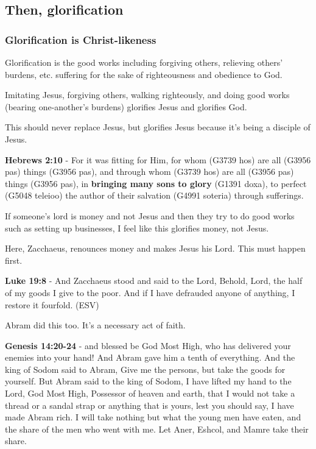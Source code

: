 \documentclass[11pt]{article}
\begin{document}
\subsection{Then, glorification}
\label{sec:orgccc315c}
\subsubsection{Glorification is Christ-likeness}
\label{sec:org62ac995}
Glorification is the good works including forgiving others, relieving others' burdens, etc. suffering for the sake of righteousness and obedience to God.

Imitating Jesus, forgiving others, walking righteously, and doing good works (bearing one-another's burdens) glorifies Jesus and glorifies God.

This should never replace Jesus, but glorifies Jesus because it's being a disciple of Jesus.

\textbf{Hebrews 2:10} - For it was fitting for Him, for whom (G3739 hos) are all (G3956 pas) things (G3956 pas), and through whom (G3739 hos) are all (G3956 pas) things (G3956 pas), in \textbf{bringing many sons to glory} (G1391 doxa), to perfect (G5048 teleioo) the author of their salvation (G4991 soteria) through sufferings.

If someone's lord is money and not Jesus and then they try to do good works such as setting up businesses, I feel like this glorifies money, not Jesus.

Here, Zacchaeus, renounces money and makes Jesus his Lord. This must happen first.

\textbf{Luke 19:8} - And Zacchaeus stood and said to the Lord, Behold, Lord, the half of my goods I give to the poor. And if I have defrauded anyone of anything, I restore it fourfold. (ESV)

Abram did this too. It's a necessary act of faith.

\textbf{Genesis 14:20-24} - and blessed be God Most High, who has delivered your enemies into your hand! And Abram gave him a tenth of everything. And the king of Sodom said to Abram, Give me the persons, but take the goods for yourself. But Abram said to the king of Sodom, I have lifted my hand to the Lord, God Most High, Possessor of heaven and earth, that I would not take a thread or a sandal strap or anything that is yours, lest you should say, I have made Abram rich. I will take nothing but what the young men have eaten, and the share of the men who went with me. Let Aner, Eshcol, and Mamre take their share.
\end{document}
